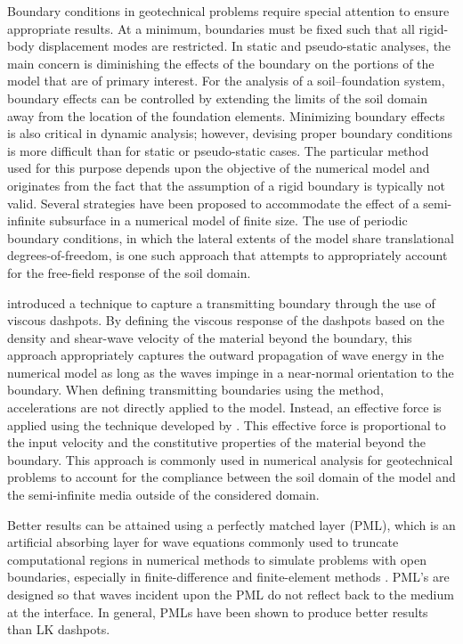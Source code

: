 Boundary conditions in geotechnical problems require special attention to ensure appropriate results. At a minimum, boundaries must be fixed such that all rigid-body displacement modes are restricted. In static and pseudo-static analyses, the main concern is diminishing the effects of the boundary on the portions of the model that are of primary interest. For the analysis of a soil--foundation system, boundary effects can be controlled by extending the limits of the soil domain away from the location of the foundation elements. Minimizing boundary effects is also critical in dynamic analysis; however, devising proper boundary conditions is more difficult than for static or pseudo-static cases. The particular method used for this purpose depends upon the objective of the numerical model and originates from the fact that the assumption of a rigid boundary is typically not valid. Several strategies have been proposed to accommodate the effect of a semi-infinite subsurface in a numerical model of finite size. The use of periodic boundary conditions, in which the lateral extents of the model share translational degrees-of-freedom, is one such approach that attempts to appropriately account for the free-field response of the soil domain. 

\citet{Lysmer69} introduced a technique to capture a transmitting boundary through the use of viscous dashpots. By defining the viscous response of the dashpots based on the density and shear-wave velocity of the material beyond the boundary, this approach appropriately captures the outward propagation of wave energy in the numerical model as long as the waves impinge in a near-normal orientation to the boundary. When defining transmitting boundaries using the \citet{Lysmer69} method, accelerations are not directly applied to the model. Instead, an effective force is applied using the technique developed by \citet{Joyner75}. This effective force is proportional to the input velocity and the constitutive properties of the material beyond the boundary. This approach is commonly used in numerical analysis for geotechnical problems to account for the compliance between the soil domain of the model and the semi-infinite media outside of the considered domain.

Better results can be attained using a perfectly matched layer (PML), which is an artificial absorbing layer for wave equations commonly used to truncate computational regions in numerical methods to simulate problems with open boundaries, especially in finite-difference and finite-element methods \citep{Zhang19}. PML's are designed so that waves incident upon the PML do not reflect back to the medium at the interface. In general, PMLs have been shown to produce better results than LK dashpots.

